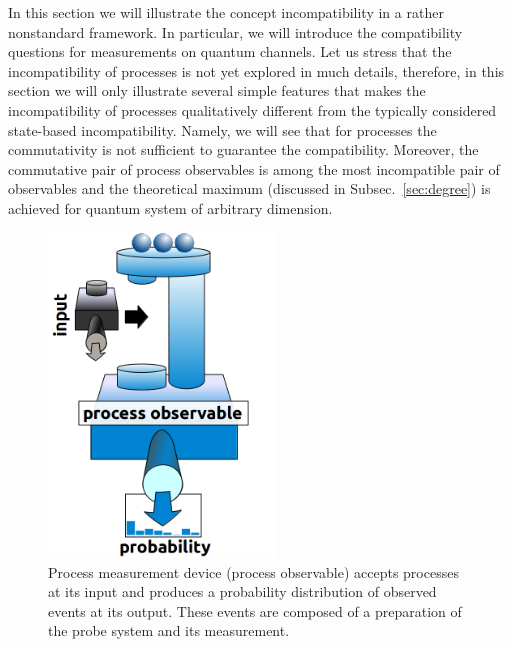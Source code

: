 \documentclass[12pt]{iopart}
\theoremstyle{definition}
\begin{document}
{In this section we will illustrate the concept incompatibility in a 
rather nonstandard framework. In particular, we will introduce the 
compatibility questions for measurements on quantum channels. Let us stress that
the incompatibility of processes is not yet explored in much details,
therefore, in this section we will only illustrate several simple features 
that makes the incompatibility of processes qualitatively different from 
the typically considered state-based incompatibility. Namely, we will see 
that for processes the commutativity is not sufficient to guarantee 
the compatibility. Moreover, the commutative pair of process observables 
is among the most incompatible pair of observables and the theoretical
maximum (discussed in Subsec.~\ref{sec:degree}) is achieved 
for quantum system of arbitrary dimension.

\begin{figure}\begin{center}
\includegraphics[width=6cm]{fig_process.png}
\caption{Process measurement device (process observable) accepts
processes at its input and produces a probability distribution
of observed events at its output. These events are composed of
a preparation of the probe system and its measurement.}
\end{center}
\end{figure}

}
\end{document}
